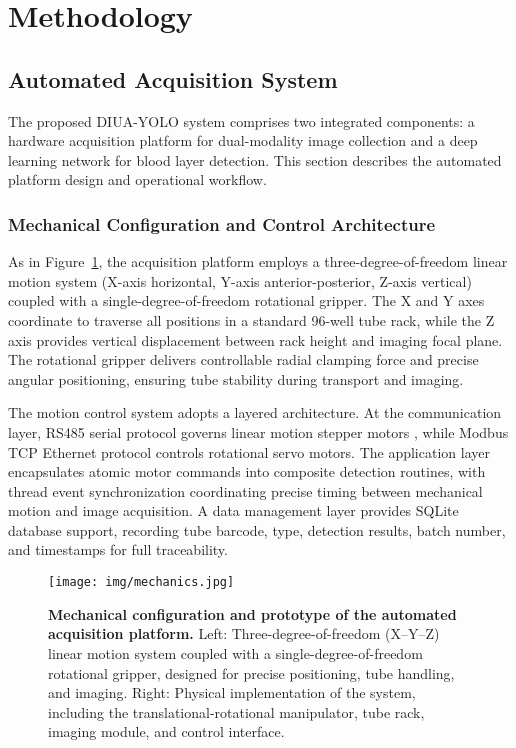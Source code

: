 \section{Methodology}
\label{sec:methodology}

\subsection{Automated Acquisition System}

The proposed DIUA-YOLO system comprises two integrated components: a hardware acquisition platform for dual-modality image collection and a deep learning network for blood layer detection. This section describes the automated platform design and operational workflow.

\subsubsection{Mechanical Configuration and Control Architecture} As in Figure~\ref{fig:mechanics}, the acquisition platform employs a three-degree-of-freedom linear motion system (X-axis horizontal, Y-axis anterior-posterior, Z-axis vertical) coupled with a single-degree-of-freedom rotational gripper. The X and Y axes coordinate to traverse all positions in a standard 96-well tube rack, while the Z axis provides vertical displacement between rack height and imaging focal plane. The rotational gripper delivers controllable radial clamping force and precise angular positioning, ensuring tube stability during transport and imaging.

The motion control system adopts a layered architecture. At the communication layer, RS485 serial protocol governs linear motion stepper motors \cite{rs}, while Modbus TCP Ethernet protocol controls rotational servo motors. The application layer encapsulates atomic motor commands into composite detection routines, with thread event synchronization coordinating precise timing between mechanical motion and image acquisition. A data management layer provides SQLite database support, recording tube barcode, type, detection results, batch number, and timestamps for full traceability.

\begin{figure}[!t]
\centerline{\texttt{[image: img/mechanics.jpg]}}
\caption{\textbf{Mechanical configuration and prototype of the automated acquisition platform.} 
Left: Three-degree-of-freedom (X–Y–Z) linear motion system coupled with a single-degree-of-freedom rotational gripper, designed for precise positioning, tube handling, and imaging. 
Right: Physical implementation of the system, including the translational-rotational manipulator, tube rack, imaging module, and control interface.}
\label{fig:mechanics}
\end{figure}

